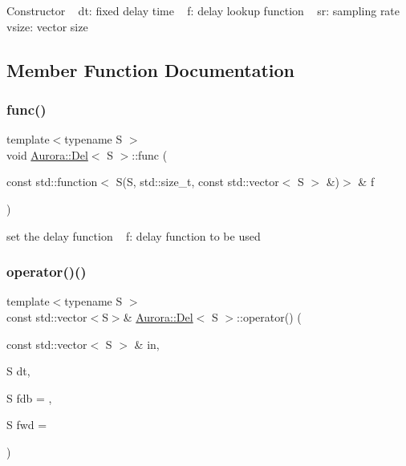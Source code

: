 Constructor ~\newline
dt\+: fixed delay time ~\newline
f\+: delay lookup function ~\newline
sr\+: sampling rate ~\newline
vsize\+: vector size 

\subsection{Member Function Documentation}
\mbox{\label{class_aurora_1_1_del_a45fdbf55fbf2452007d7b8985bbd42ca}} 
\subsubsection{\texorpdfstring{func()}{func()}}
{\footnotesize\ttfamily template$<$typename S $>$ \\
void \hyperlink{class_aurora_1_1_del}{Aurora\+::\+Del}$<$ S $>$\+::func (\begin{DoxyParamCaption}\item[{const std\+::function$<$ S(S, std\+::size\+\_\+t, const std\+::vector$<$ S $>$ \&)$>$ \&}]{f }\end{DoxyParamCaption})\hspace{0.3cm}{\ttfamily [inline]}}

set the delay function ~\newline
f\+: delay function to be used \mbox{\label{class_aurora_1_1_del_a7061e3fc28fa7c9cace2f194c0c2933b}} 
\subsubsection{\texorpdfstring{operator()()}{operator()()}\hspace{0.1cm}{\footnotesize\ttfamily [1/2]}}
{\footnotesize\ttfamily template$<$typename S $>$ \\
const std\+::vector$<$S$>$\& \hyperlink{class_aurora_1_1_del}{Aurora\+::\+Del}$<$ S $>$\+::operator() (\begin{DoxyParamCaption}\item[{const std\+::vector$<$ S $>$ \&}]{in,  }\item[{S}]{dt,  }\item[{S}]{fdb = {},  }\item[{S}]{fwd = {} }\end{DoxyParamCaption})\hspace{0.3cm}{\ttfamily [inline]}}

